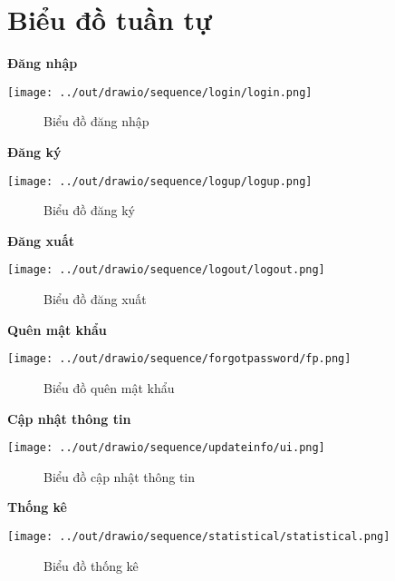 \section{Biểu đồ tuần tự}

  \textbf{Đăng nhập}
    \begin{center}
      \texttt{[image: ../out/drawio/sequence/login/login.png]}
      \begin{figure}[h]
        \centering
        \caption{Biểu đồ đăng nhập}
      \end{figure}
    \end{center}

  \textbf{Đăng ký}
    \begin{center}
      \texttt{[image: ../out/drawio/sequence/logup/logup.png]}
      \begin{figure}[h]
        \centering
        \caption{Biểu đồ đăng ký}
      \end{figure}
    \end{center}

  \textbf{Đăng xuất}
    \begin{center}
      \texttt{[image: ../out/drawio/sequence/logout/logout.png]}
      \begin{figure}[h]
        \centering
        \caption{Biểu đồ đăng xuất}
      \end{figure}
    \end{center}

  \textbf{Quên mật khẩu}
    \begin{center}
      \texttt{[image: ../out/drawio/sequence/forgotpassword/fp.png]}
      \begin{figure}[h]
        \centering
        \caption{Biểu đồ quên mật khẩu}
      \end{figure}
    \end{center}

  \textbf{Cập nhật thông tin}
    \begin{center}
      \texttt{[image: ../out/drawio/sequence/updateinfo/ui.png]}
      \begin{figure}[h]
        \centering
        \caption{Biểu đồ cập nhật thông tin}
      \end{figure}
    \end{center}

  \textbf{Thống kê}
    \begin{center}
      \texttt{[image: ../out/drawio/sequence/statistical/statistical.png]}
      \begin{figure}[h]
        \centering
        \caption{Biểu đồ thống kê}
      \end{figure}
    \end{center}

